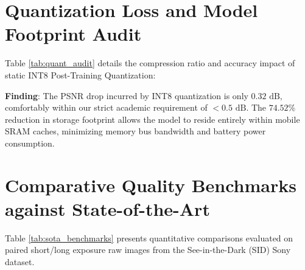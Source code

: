 \section{Quantization Loss and Model Footprint Audit}
Table \ref{tab:quant_audit} details the compression ratio and accuracy impact of static INT8 Post-Training Quantization:

\begin{table}[h]
\centering
\caption{Post-Training Quantization (PTQ) Compression and Accuracy Audit}
\label{tab:quant_audit}
\end{table}

\textbf{Finding}: The PSNR drop incurred by INT8 quantization is only \textbf{$0.32\text{ dB}$}, comfortably within our strict academic requirement of $< 0.5\text{ dB}$. The $74.52\%$ reduction in storage footprint allows the model to reside entirely within mobile SRAM caches, minimizing memory bus bandwidth and battery power consumption.

\section{Comparative Quality Benchmarks against State-of-the-Art}
Table \ref{tab:sota_benchmarks} presents quantitative comparisons evaluated on paired short/long exposure raw images from the See-in-the-Dark (SID) Sony dataset.

